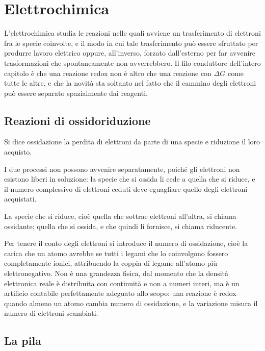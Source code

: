 \chapter{Elettrochimica}
 
L'elettrochimica studia le reazioni nelle quali avviene un trasferimento di elettroni fra le specie coinvolte, e il modo in cui tale trasferimento può essere sfruttato per produrre lavoro elettrico oppure, all'inverso, forzato dall'esterno per far avvenire trasformazioni che spontaneamente non avverrebbero.
Il filo conduttore dell'intero capitolo è che una reazione redox non è altro che una reazione con $\Delta G$ come tutte le altre, e che la novità sta soltanto nel fatto che il cammino degli elettroni può essere separato spazialmente dai reagenti.
 
\section{Reazioni di ossidoriduzione}
 
Si dice ossidazione la perdita di elettroni da parte di una specie e riduzione il loro acquisto.

I due processi non possono avvenire separatamente, poiché gli elettroni non esistono liberi in soluzione: la specie che si ossida li cede a quella che si riduce, e il numero complessivo di elettroni ceduti deve eguagliare quello degli elettroni acquistati.

La specie che si riduce, cioè quella che sottrae elettroni all'altra, si chiama ossidante; quella che si ossida, e che quindi li fornisce, si chiama riducente.
 
Per tenere il conto degli elettroni si introduce il numero di ossidazione, cioè la carica che un atomo avrebbe se tutti i legami che lo coinvolgono fossero completamente ionici, attribuendo la coppia di legame all'atomo più elettronegativo.
Non è una grandezza fisica, dal momento che la densità elettronica reale è distribuita con continuità e non a numeri interi, ma è un artificio contabile perfettamente adeguato allo scopo: una reazione è redox quando almeno un atomo cambia numero di ossidazione, e la variazione misura il numero di elettroni scambiati.
 
\section{La pila}
 
